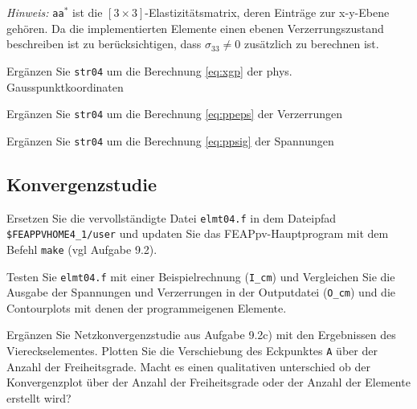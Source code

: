 \textit{Hinweis:} 
\verb|aa|$^*$ ist die $[3\times3]$-Elastizitätsmatrix, deren Einträge zur x-y-Ebene gehören.
Da die implementierten Elemente einen ebenen Verzerrungszustand beschreiben ist zu berücksichtigen, dass $\sigma_{33}\neq 0$ zusätzlich zu berechnen ist.

\enab
\item Ergänzen Sie \verb|str04| um die Berechnung \eqref{eq:xgp} der phys. Gausspunktkoordinaten
\item Ergänzen Sie \verb|str04| um die Berechnung \eqref{eq:ppeps} der Verzerrungen
\item Ergänzen Sie \verb|str04| um die Berechnung \eqref{eq:ppsig} der Spannungen
\enae


\clearpage
\subsection{Konvergenzstudie}

\enab
\item Ersetzen Sie die vervollständigte Datei \verb|elmt04.f| in dem Dateipfad \verb|$FEAPPVHOME4_1/user| und updaten Sie das FEAPpv-Hauptprogram mit dem Befehl \verb|make|
(vgl Aufgabe 9.2).%
\item Testen Sie \verb|elmt04.f| mit einer Beispielrechnung (\verb|I_cm|) und Vergleichen Sie die Ausgabe der Spannungen und Verzerrungen in der Outputdatei (\verb|O_cm|) und die Contourplots mit denen der programmeigenen Elemente.
\item Ergänzen Sie Netzkonvergenzstudie aus Aufgabe 9.2c) mit den Ergebnissen des Viereckselementes.
Plotten Sie die Verschiebung des Eckpunktes \verb|A| über der Anzahl der Freiheitsgrade.
Macht es einen qualitativen unterschied ob der Konvergenzplot über der Anzahl der Freiheitsgrade oder der Anzahl der Elemente erstellt wird? 
\enae


% 
